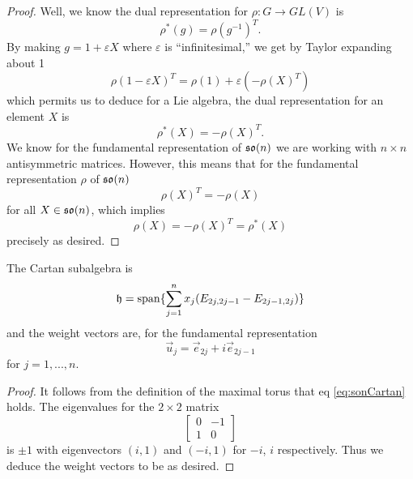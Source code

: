 \begin{proof}
Well, we know the dual representation for $\rho\colon G\to GL(V)$
is
\begin{equation}
\rho^{*}(g)=\rho(g^{-1})^{T}.
\end{equation}
By making $g=1+\varepsilon X$ where $\varepsilon$ is
``infinitesimal,'' we get by Taylor expanding about 1 
\begin{equation}
\rho(1-\varepsilon X)^{T}=\rho(1)+\varepsilon\left(-\rho(X)^{T}\right)
\end{equation}
which permits us to deduce for a Lie algebra, the dual
representation for an element $X$ is
\begin{equation}
\rho^{*}(X)=-\rho(X)^{T}.
\end{equation}
We know for the fundamental representation of $\frak{so}(n)$ we
are working with $n\times n$ antisymmetric matrices. However,
this means that for the fundamental representation $\rho$ of $\frak{so}(n)$
\begin{equation}
\rho(X)^{T}=-\rho(X)
\end{equation}
for all $X\in\frak{so}(n)$, which implies
\begin{equation}
\rho(X)=-\rho(X)^{T}=\rho^{*}(X)
\end{equation}
precisely as desired.
\end{proof}

\begin{prop}
The Cartan subalgebra is
\begin{equation}\label{eq:sonCartan}
\frak{h}={\rm span}\{\sum_{j=1}^{n}x_{j}(E_{2j,2j-1}-E_{2j-1,2j})\}
\end{equation}
and the weight vectors are, for the fundamental representation
\begin{equation}
\vec{u}_{j}=\vec{e}_{2j}+i\vec{e}_{2j-1}
\end{equation}
for $j=1,...,n$.
\end{prop}
\begin{proof}
It follows from the definition of the maximal torus that eq \eqref{eq:sonCartan}
 holds. The eigenvalues for the $2\times2$ matrix
\begin{equation}
\begin{bmatrix}0&-1\\1&0
\end{bmatrix}
\end{equation}
is $\pm1$ with eigenvectors $(i,1)$ and $(-i,1)$ for $-i$, $i$
respectively. Thus we deduce the weight vectors to be as desired.
\end{proof}

